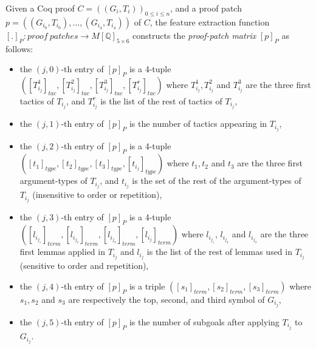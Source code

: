 \begin{definition}\label{def:ptm}
Given a Coq proof $C=((G_i,T_i))_{0\leq i\leq n}$, and a proof patch $p=((G_{i_0},T_{i_0}),\ldots,(G_{i_4},T_{i_4}))$ of $C$,
the feature extraction function $[.]_P: proof~patches \rightarrow M[\mathbb{Q}]_{5\times 6}$ constructs the \emph{proof-patch matrix} $[p]_P$
as follows:

\begin{itemize}
 \item the $(j,0)$-th entry of $[p]_P$ is a 4-tuple $([T_{i_j}^1]_{tac}, [T_{i_j}^2]_{tac},[T_{i_j}^3]_{tac},[T_{i_j}^r]_{tac})$
 where $T_{i_j}^1, T_{i_j}^2$ and $T_{i_j}^3$ are the three first tactics of $T_{i_j}$, and $T_{i_j}^r$ is the list of the rest of tactics of $T_{i_j}$,
 \item the $(j,1)$-th entry of $[p]_P$ is the number of tactics appearing in $T_{i_j}$,
 \item the $(j,2)$-th entry of $[p]_P$ is a 4-tuple $([t_1]_{type},[t_2]_{type},[t_3]_{type},[t_{i_j}]_{type})$ where
 $t_1, t_2$ and $t_3$ are the three first argument-types of $T_{i_j}$, and $t_{i_j}$ is the set of the rest of
 the argument-types of $T_{i_j}$ (insensitive to order or repetition),
 \item the $(j,3)$-th entry of $[p]_P$ is a 4-tuple  $([l_{i_{j_1}}]_{term},[l_{i_{j_2}}]_{term},[l_{i_{j_3}}]_{term},[l_{i_j}]_{term})$
 where $l_{i_{j_1}}$, $l_{i_{j_2}}$ and $l_{i_{j_3}}$ are the three first lemmas applied in $T_{i_j}$ and $l_{i_j}$ is the list of the rest of lemmas
used in $T_{i_j}$ (sensitive to order and repetition),
 \item the $(j,4)$-th entry of $[p]_P$ is a triple  $([s_1]_{term},[s_2]_{term},[s_3]_{term})$ where $s_1,s_2$ and $s_3$ are respectively the top, second, and third
 symbol of $G_{i_j}$,
 \item the $(j,5)$-th entry of $[p]_P$ is the number of subgoals after applying $T_{i_j}$ to $G_{i_j}$.
\end{itemize}
\end{definition}


